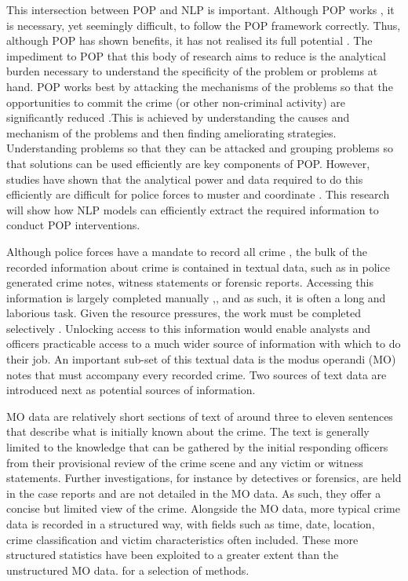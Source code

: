 This intersection between POP and NLP is important. Although POP works \parencite{hinkle2020problem}, it is necessary, yet seemingly difficult, to follow the POP framework correctly. Thus, although POP has shown benefits, it has not realised its full potential \parencite{POPUCL}. The impediment to POP that this body of research aims to reduce is the analytical burden necessary to understand the specificity of the problem or problems at hand. POP works best by attacking the mechanisms of the problems so that the opportunities to commit the crime (or other non-criminal activity) are significantly reduced \parencite{clarke2003becoming}.This is achieved by understanding the causes and mechanism of the problems and then finding ameliorating strategies. Understanding problems so that they can be attacked and grouping problems so that solutions can be used efficiently are key components of POP. However, studies have shown that the analytical power and data required to do this efficiently are difficult for police forces to muster and coordinate \parencite{sidebottom2020implementing}. This research will show how NLP models can efficiently extract the required information to conduct POP interventions. 

Although police forces have a mandate to record all crime \parencite{home2020crime}, the bulk of the recorded information about crime is contained in textual data, such as in police generated crime notes, witness statements or forensic reports. Accessing this information is largely completed manually \parencite{goldstein1990},, and as such, it is often a long and laborious task. Given the resource pressures, the work must be completed selectively \parencite{rogerson2016utility}. Unlocking access to this information would enable analysts and officers practicable access to a much wider source of information with which to do their job. An important sub-set of this textual data is the modus operandi (MO) notes that must accompany every recorded crime. Two sources of text data are introduced next as potential sources of information.

MO data are relatively short sections of text of around three to eleven sentences that describe what is initially known about the crime. The text is generally limited to the knowledge that can be gathered by the initial responding officers from their provisional review of the crime scene and any victim or witness statements. Further investigations, for instance by detectives or forensics, are held in the case reports and are not detailed in the MO data. As such, they offer a concise but limited view of the crime. Alongside the MO data, more typical crime data is recorded in a structured way, with fields such as time, date, location, crime classification and victim characteristics often included. These more structured statistics have been exploited to a greater extent than the unstructured MO data. \textcite{mapchap10, ratcliffe1998aoristic, braga2014effects, weisel2016analyzing} for a selection of methods.

